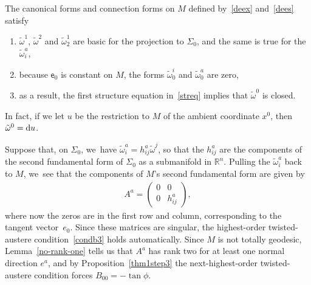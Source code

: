 \documentclass[10pt,a4paper]{amsart}
\def\R{\mathbb{R}}
\def\ve{\mathsf{e}}
\def\wt{\tilde\omega}
\numberwithin{equation}{section}
\begin{document}
The canonical forms and connection forms on $M$ defined by~\eqref{deex} and~\eqref{dees} satisfy
\begin{enumerate}[$(i)$]\itemsep=0pt
\item $\wt^1$, $\wt^2$ and $\wt^1_2$ are basic for the projection to $\Sigma_0$, and the same is true for the $\wt^a_i$,
\item because $\ve_0$ is constant on $M$, the forms $\wt^i_0$ and $\wt^a_0$ are zero,
\item as a result, the first structure equation in~\eqref{streq} implies that $\wt^0$ is closed.
\end{enumerate}
In fact, if we let $u$ be the restriction to $M$ of the ambient coordinate $x^0$, then $\wt^0={\rm d}u$.

Suppose that, on $\Sigma_0$, we~have $\wt^a_i = h^a_{ij} \wt^j$, so that the $h^a_{ij}$ are the components of the second fundamental form of $\Sigma_0$ as a submanifold in $\R^n$. Pulling the $\wt^a_i$ back to $M$, we~see that the components of $M$'s second fundamental form are given by
\begin{gather} \label{cylinderAform}
A^a = \begin{pmatrix} 0 & 0 \\ 0 & h^a_{ij} \end{pmatrix},
\end{gather}
where now the zeros are in the first row and column, corresponding to the tangent vector~$e_0$. Since these matrices are singular, the highest-order twisted-austere condition~\eqref{condb3} holds automatically. Since $M$ is not totally geodesic, Lemma~\ref{no-rank-one} tells us that $A^a$ has rank two for at least one normal direction $e^a$, and by Proposition~\ref{thm1step3} the next-highest-order twisted-austere condition forces $B_{00}=-\tan\phi$.
\end{document}
